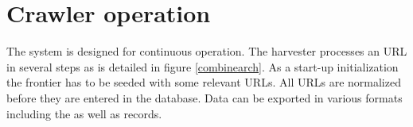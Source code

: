 \section{Crawler operation}
\label{operation}
The system is designed for continuous operation.
The harvester processes an URL in several steps as is detailed
in figure \ref{combinearch}.  As a start-up initialization the
frontier has to be seeded with some relevant URLs. All URLs are
normalized before they are entered in the database.
Data can be exported in various formats including the  as well as 
 records.

\begin{figure}[htb]
\begin{center}

\end{center}
\end{figure}

